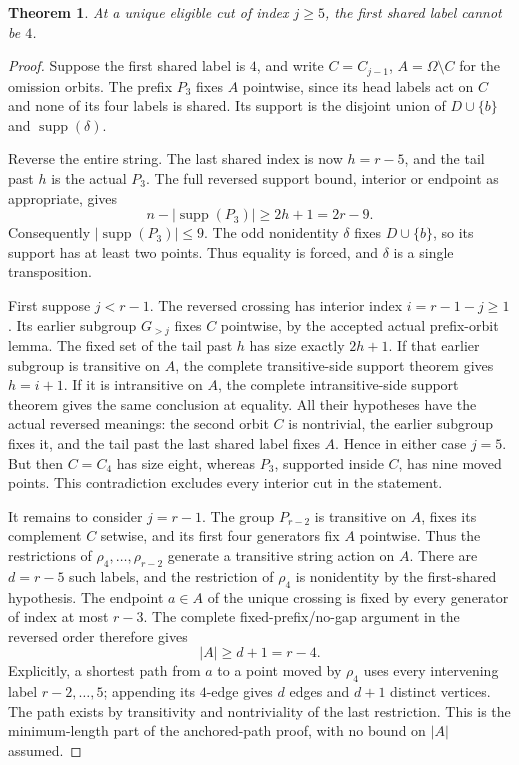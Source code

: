 \documentclass[11pt,a4paper]{article}
\newtheorem{theorem}[lemma]{Theorem}
\begin{document}
\begin{theorem}\label{exclude}
At a unique eligible cut of index $j\geq5$, the first shared
label cannot be $4$.
\end{theorem}
\begin{proof}
Suppose the first shared label is $4$, and write
$C=C_{j-1}$, $A=\Omega\setminus C$ for the omission orbits.
The prefix $P_3$ fixes $A$ pointwise, since its head labels act
on $C$ and none of its four labels is shared. Its support is
the disjoint union of $D\cup\{b\}$ and $\operatorname{supp}(\delta)$.

Reverse the entire string. The last shared index is now
$h=r-5$, and the tail past $h$ is the actual $P_3$.
The full reversed support bound, interior or endpoint as
appropriate, gives
\[
 n-|\operatorname{supp}(P_3)|\geq2h+1=2r-9.
\]
Consequently $|\operatorname{supp}(P_3)|\leq9$.
The odd nonidentity $\delta$ fixes $D\cup\{b\}$, so its support
has at least two points. Thus equality is forced, and $\delta$
is a single transposition.

First suppose $j<r-1$. The reversed crossing has interior
index $i=r-1-j\geq1$. Its earlier subgroup $G_{>j}$ fixes
$C$ pointwise, by the accepted actual prefix-orbit lemma.
The fixed set of the tail past $h$ has size exactly $2h+1$.
If that earlier subgroup is transitive on $A$, the complete
transitive-side support theorem gives $h=i+1$.
If it is intransitive on $A$, the complete intransitive-side
support theorem gives the same conclusion at equality.
All their hypotheses have the actual reversed meanings:
the second orbit $C$ is nontrivial, the earlier subgroup fixes
it, and the tail past the last shared label fixes $A$.
Hence in either case $j=5$.
But then $C=C_4$ has size eight, whereas $P_3$, supported
inside $C$, has nine moved points. This contradiction excludes
every interior cut in the statement.

It remains to consider $j=r-1$. The group $P_{r-2}$ is
transitive on $A$, fixes its complement $C$ setwise, and its
first four generators fix $A$ pointwise. Thus the restrictions
of $\rho_4,\ldots,\rho_{r-2}$ generate a transitive string action
on $A$. There are $d=r-5$ such labels, and the restriction of
$\rho_4$ is nonidentity by the first-shared hypothesis.
The endpoint $a\in A$ of the unique crossing is fixed by
every generator of index at most $r-3$.
The complete fixed-prefix/no-gap argument in the reversed
order therefore gives
\[
                         |A|\geq d+1=r-4.              \tag{1}
\]
Explicitly, a shortest path from $a$ to a point moved by
$\rho_4$ uses every intervening label $r-2,\ldots,5$;
appending its $4$-edge gives $d$ edges and $d+1$ distinct
vertices. The path exists by transitivity and nontriviality
of the last restriction. This is the minimum-length part of
the anchored-path proof, with no bound on $|A|$ assumed.


\end{proof}
\end{document}

